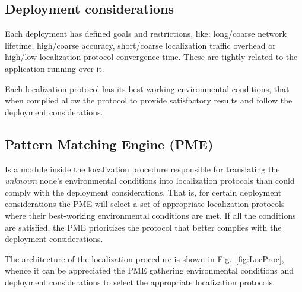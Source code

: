 \subsection{Deployment considerations}\label{deploymentConsiderations}
Each deployment has defined goals and restrictions, like: long/coarse network lifetime, high/coarse accuracy, short/coarse localization traffic overhead or high/low localization protocol convergence time. These are tightly related to the application running over it.

Each localization protocol has its best-working environmental conditions, that when complied allow the protocol to provide satisfactory results and follow the deployment considerations.

\subsection{Pattern Matching Engine (PME)}\label{PME}
Is a module inside the localization procedure responsible for translating the \emph{unknown} node's environmental conditions into localization protocols than could comply with the deployment considerations. That is, for certain deployment considerations the PME will select a set of appropriate localization protocols where their best-working environmental conditions are met. If all the conditions are satisfied, the PME prioritizes the protocol that better complies with the deployment considerations. 

The architecture of the localization procedure is shown in Fig.~\ref{fig:LocProc}, whence it can be appreciated the PME gathering environmental conditions and deployment considerations to select the appropriate localization protocols.

